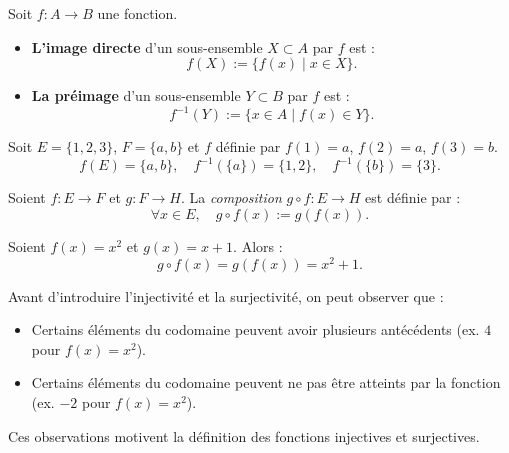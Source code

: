 
\begin{definition}
    Soit $f : A \longrightarrow B$ une fonction.
    \begin{itemize}
        \item \textbf{L'image directe} d'un sous-ensemble $X \subset A$ par $f$ est :
        \[
            f(X) := \{ f(x) \mid x \in X \}.
        \]
        \item \textbf{La préimage} d'un sous-ensemble $Y \subset B$ par $f$ est :
        \[
            f^{-1}(Y) := \{ x \in A \mid f(x) \in Y \}.
        \]
    \end{itemize}
\end{definition}

\begin{example}
    Soit $E = \{1,2,3\}$, $F = \{a,b\}$ et $f$ définie par $f(1)=a$, $f(2)=a$, $f(3)=b$.
    \[
        f(E) = \{a,b\}, \quad f^{-1}(\{a\}) = \{1,2\}, \quad f^{-1}(\{b\}) = \{3\}.
    \]
\end{example}


\begin{definition}
    Soient $f : E \longrightarrow F$ et $g : F \longrightarrow H$. La \emph{composition} $g \circ f : E \longrightarrow H$ est définie par :
    \[
        \forall x \in E, \quad g \circ f (x) := g(f(x)).
    \]
\end{definition}

\begin{example}
    Soient $f(x) = x^2$ et $g(x) = x+1$. Alors :
    \[
        g \circ f (x) = g(f(x)) = x^2 + 1.
    \]
\end{example}


\begin{remark}
    Avant d’introduire l’injectivité et la surjectivité, on peut observer que :
    \begin{itemize}
        \item Certains éléments du codomaine peuvent avoir plusieurs antécédents (ex. $4$ pour $f(x)=x^2$).
        \item Certains éléments du codomaine peuvent ne pas être atteints par la fonction (ex. $-2$ pour $f(x)=x^2$).
    \end{itemize}
    Ces observations motivent la définition des fonctions injectives et surjectives.
\end{remark}


